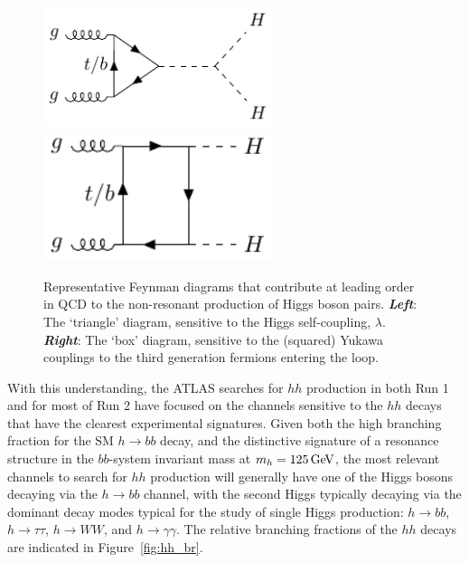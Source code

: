 \begin{figure}[!htb]
    \begin{center}
        \includegraphics[width=0.6\textwidth]{figures/search_hh/feynman_diagrams/fdiagram_triangle}
        \includegraphics[width=0.6\textwidth]{figures/search_hh/feynman_diagrams/fdiagram_box}
        \caption{
            Representative Feynman diagrams that contribute at leading order in QCD to the non-resonant
            production of Higgs boson pairs.
            {\textbf{\textit{Left}}}: The `triangle' diagram, sensitive to the Higgs self-coupling, $\lambda$.
            {\textbf{\textit{Right}}}: The `box' diagram, sensitive to the (squared) Yukawa couplings to the third generation
            fermions entering the loop.
        }
        \label{fig:hh_feynman}
    \end{center}
\end{figure}

With this understanding, the ATLAS searches for $hh$ production in both Run 1 and for most of Run 2 have focused
on the channels sensitive to the $hh$ decays that have the clearest experimental signatures.
Given both the high branching fraction for the SM $h \rightarrow bb$ decay, and the distinctive signature
of a resonance structure in the $bb$-system invariant mass at $m_h = 125\,\text{Ge\kern -0.1em V}$, the most relevant channels to search for $hh$
production will generally have one of the Higgs bosons decaying via the $h \rightarrow bb$ channel, with the
second Higgs typically decaying via the dominant decay modes typical for the study of single Higgs production: $h \rightarrow bb$, $h \rightarrow \tau \tau$, 
$h \rightarrow WW$, and $h \rightarrow \gamma \gamma$.
The relative branching fractions of the $hh$ decays are indicated in Figure~\ref{fig:hh_br}.

